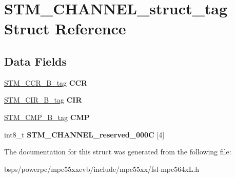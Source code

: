 \hypertarget{structSTM__CHANNEL__struct__tag}{}\section{S\+T\+M\+\_\+\+C\+H\+A\+N\+N\+E\+L\+\_\+struct\+\_\+tag Struct Reference}
\label{structSTM__CHANNEL__struct__tag}
\subsection*{Data Fields}
\begin{DoxyCompactItemize}
\item 
\mbox{\label{structSTM__CHANNEL__struct__tag_a66b8afedd4f11763b2c6123d8210bb9a}} 
\mbox{\hyperlink{unionSTM__CCR__32B__tag}{S\+T\+M\+\_\+\+C\+C\+R\+\_\+B\+\_\+tag}} {\bfseries C\+CR}
\item 
\mbox{\label{structSTM__CHANNEL__struct__tag_a65c8945252dc192162d3668664f5781a}} 
\mbox{\hyperlink{unionSTM__CIR__32B__tag}{S\+T\+M\+\_\+\+C\+I\+R\+\_\+B\+\_\+tag}} {\bfseries C\+IR}
\item 
\mbox{\label{structSTM__CHANNEL__struct__tag_a626703f817a7b0bb81df152120c58127}} 
\mbox{\hyperlink{unionSTM__CMP__32B__tag}{S\+T\+M\+\_\+\+C\+M\+P\+\_\+B\+\_\+tag}} {\bfseries C\+MP}
\item 
\mbox{\label{structSTM__CHANNEL__struct__tag_acea11cbd55029858d903a93ad208c77e}} 
int8\+\_\+t {\bfseries S\+T\+M\+\_\+\+C\+H\+A\+N\+N\+E\+L\+\_\+reserved\+\_\+000C} \mbox{[}4\mbox{]}
\end{DoxyCompactItemize}


The documentation for this struct was generated from the following file\+:\begin{DoxyCompactItemize}
\item 
bsps/powerpc/mpc55xxevb/include/mpc55xx/fsl-\/mpc564x\+L.\+h\end{DoxyCompactItemize}
